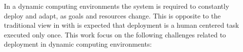 In a dynamic computing environments the system is required to constantly deploy and adapt, as goals and resources change. This is opposite to the traditional view  in with is expected that deployment is a human centered task executed only once.
This work focus on the following challenges related to deployment in dynamic computing environments:

\label{sec:problem}

